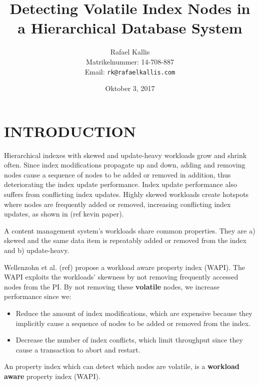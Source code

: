 \documentclass[abstracton,12pt]{scrreprt}
\title{Detecting Volatile Index Nodes in a Hierarchical Database System}
\author{
  Rafael Kallis\\[-5pt]
  \scriptsize Matrikelnummer: 14-708-887\\[-5pt]
  \scriptsize Email: \texttt{rk@rafaelkallis.com}
}
\date{\vspace*{2cm}Oktober 3, 2017}
\begin{document}
\maketitle





\chapter{INTRODUCTION}

Hierarchical indexes with skewed and update-heavy workloads grow and shrink often.
Since index modifications propagate up and down, adding and removing nodes cause a sequence of nodes to be added or removed in addition, thus deteriorating the index update performance.
Index update performance also suffers from conflicting index updates.
Highly skewed workloads create hotspots where nodes are frequently added or removed, increasing conflicting index updates, as shown in (ref kevin paper).

A content management system's workloads share common properties.
They are a) skewed and the same data item is repeatably added or removed from the index and
b) update-heavy.

Wellenzohn et al. (ref) propose a workload aware property index (WAPI). 
The WAPI exploits the workloads' skewness by not removing frequently accessed nodes from the PI.
By not removing these \textbf{volatile} nodes, we increase performance since we:
\begin{itemize}
    \item Reduce the amount of index modifications, which are expensive because they implicitly cause a sequence of nodes to be added or removed from the index.
    \item Decrease the number of index conflicts, which limit throughput since they cause a transaction to abort and restart.
\end{itemize}
An property index which can detect which nodes are volatile, is a \textbf{workload aware} property index (WAPI).
\end{document}
